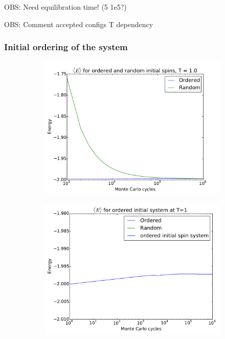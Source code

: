OBS: Need equilibration time! (5 1e5?)

OBS: Comment accepted configs T dependency


\subsubsection{Initial ordering of the system}






\begin{figure}[H]
	\begin{subfigure}[b]{0.49\textwidth}
	\includegraphics[width=1\linewidth]{../results/4c/ran_order_T1}
\caption{}
\label{fig:ranordert1}
	\end{subfigure}
	\hfill
	\begin{subfigure}[b]{0.49\textwidth}
	\includegraphics[width=1\linewidth]{../results/4c/order_T1_start}
\caption{}
\label{fig:ordert1start}
	\end{subfigure}
	\caption{}
\end{figure}











